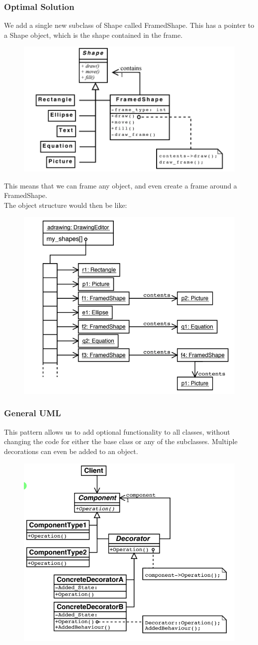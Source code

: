 \documentclass{article}
\begin{document}
\subsubsection*{Optimal Solution}
We add a single new subclass of Shape called FramedShape. This has a pointer to a Shape object, which is the shape contained in the frame.
\begin{figure}[H]
    \centering
    \includegraphics[width=0.6\linewidth]{Pictures/Screenshot 2023-02-05 at 12.36.52.png}
\end{figure}
This means that we can frame any object, and even create a frame around a FramedShape. \\
The object structure would then be like:
\begin{figure}[H]
    \centering
    \includegraphics[width=0.5\linewidth]{Pictures/Screenshot 2023-02-05 at 12.38.02.png}
\end{figure}
\subsubsection*{General UML}
This pattern allows us to add optional functionality to all classes, without changing the code for either the base class or any of the subclasses. Multiple decorations can even be added to an object.
\begin{figure}[H]
    \centering
    \includegraphics[width=0.6\linewidth]{Pictures/Screenshot 2023-02-05 at 12.39.52.png}
\end{figure}
\end{document}
